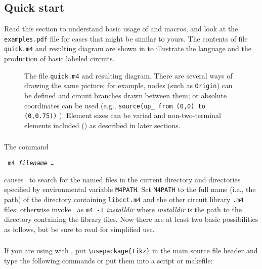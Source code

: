 \subsection{Quick start\label{Quickstart:}}
Read this section to understand basic usage of \Mfour and macros,
and look at the {\tt examples.pdf} file for cases
that might be similar to yours.
The contents of file {\tt quick.m4} and resulting diagram are shown
in  to illustrate the language and the production of basic
labeled circuits.
\begin{figure}[ht]
   \parbox{\textwidth}{\small}%
   \hfill\llap{\raise-1.15in\hbox{ }}%
   \vspace*{-\baselineskip}%
   \caption{The file {\tt quick.m4} and resulting diagram.
     There are several ways of drawing the same picture; for example,
      nodes (such as {\tt Origin}) can be defined and circuit branches
      drawn between them; or absolute coordinates can be used (e.g.,
      {\tt source(up\_ from (0,0) to (0,0.75))} ).  Element sizes
      can be varied and non-two-terminal elements included ()
      as described in later sections.\label{quick}}%
   \end{figure}

\subsubsection{%
\label{Usingmfour:}}
The command

  {\vspace*\parsep\tt
    m4 {\sl filename \ldots}
   \vspace*\parsep}

\noindent
causes \Mfour\ to search for the named
files in the current directory and directories specified
by environmental variable {\tt M4PATH}. 
Set {\tt M4PATH} to the full name (i.e., the path) of the directory containing
{\tt libcct.m4} and the other circuit library {\tt .m4} files; otherwise
invoke \Mfour\ as {\tt m4 -I} {\sl installdir} 
where {\sl installdir} is the path to the directory
containing the library files.
Now there are at least two basic possibilities as follows,
but be sure to read  for simplified use.

\subsubsection{%
\label{Processingwithpstricks:}}
If you are using \dpic  with \TPGF,
put \verb|\usepackage{tikz}| in the main \latex source file header and
type the following commands or put them into a script or makefile:

